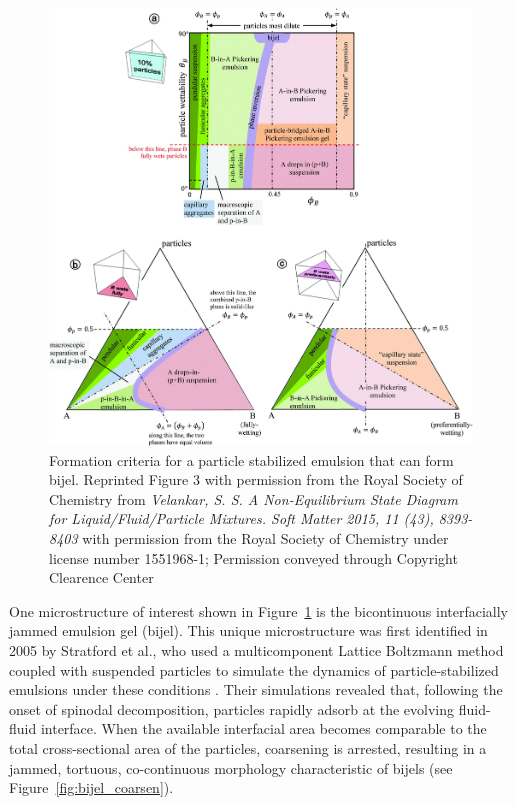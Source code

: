 \begin{figure}
    \centering
    \includegraphics[scale = 0.3]{figures/literature_review/state_diagram.jpg}
    \caption{Formation criteria for a particle stabilized emulsion that can form bijel. Reprinted Figure 3 with permission from the Royal Society of Chemistry from 
             \textit{Velankar, S. S. A Non-Equilibrium State Diagram for Liquid/Fluid/Particle Mixtures. Soft Matter 2015, 11 (43), 8393-8403}
             with permission from the Royal Society of Chemistry under license number 1551968-1; Permission conveyed through Copyright Clearence Center}
    \label{fig:state_diagram_particle_emulsions}
\end{figure}

One microstructure of interest shown in Figure~\ref{fig:state_diagram_particle_emulsions} is the bicontinuous interfacially jammed emulsion gel (bijel). This unique microstructure was 
first identified in 2005 by Stratford et al., who used a multicomponent Lattice Boltzmann method coupled with suspended particles to simulate the 
dynamics of particle-stabilized emulsions under these conditions \cite{stratford_colloidal_2005}. Their simulations revealed that, following the onset of spinodal decomposition, particles 
rapidly adsorb at the evolving fluid-fluid interface. When the available interfacial area becomes comparable to the total cross-sectional area of the particles, coarsening is arrested, 
resulting in a jammed, tortuous, co-continuous morphology characteristic of bijels (see Figure~\ref{fig:bijel_coarsen}).


